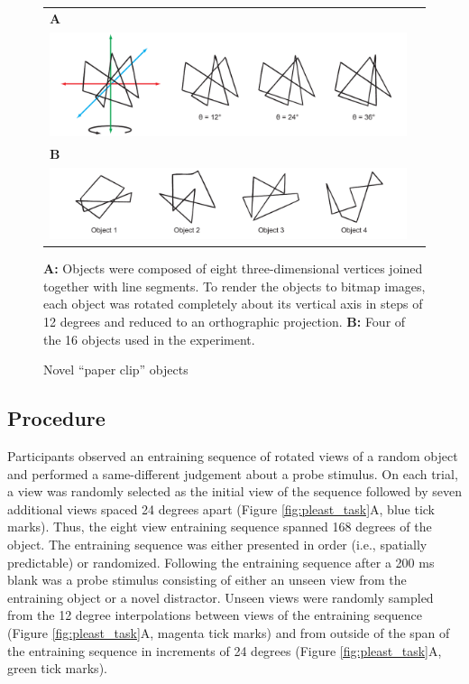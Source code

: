 \documentclass[dwyatte_dissertation.tex]{subfiles}
\begin{document}
\begin{figure}[h!]
\begin{center}
\begin{tabular}{ll}
\textbf{A} \\
\includegraphics[width=160mm]{figs/chap_pleast/paperclip_rots.pdf} \\
\textbf{B} \\
\includegraphics[width=160mm]{figs/chap_pleast/paperclip_objs.pdf} \\
\end{tabular}
\end{center}
\caption{Novel ``paper clip'' objects}{\textbf{A:} Objects were composed of eight three-dimensional vertices joined together with line segments. To render the objects to bitmap images, each object was rotated completely about its vertical axis in steps of 12 degrees and reduced to an orthographic projection. \textbf{B:} Four of the 16 objects used in the experiment.}
\label{fig:pleast_objs}
\end{figure}

\subsection{Procedure}
Participants observed an entraining sequence of rotated views of a random object and performed a same-different judgement about a probe stimulus. On each trial, a view was randomly selected as the initial view of the sequence followed by seven additional views spaced 24 degrees apart (Figure \ref{fig:pleast_task}A, blue tick marks). Thus, the eight view entraining sequence spanned 168 degrees of the object. The entraining sequence was either presented in order (i.e., spatially predictable) or randomized. Following the entraining sequence after a 200 ms blank was a probe stimulus consisting of either an unseen view from the entraining object or a novel distractor. Unseen views were randomly sampled from the 12 degree interpolations between views of the entraining sequence (Figure \ref{fig:pleast_task}A, magenta tick marks) and from outside of the span of the entraining sequence in increments of 24 degrees (Figure \ref{fig:pleast_task}A, green tick marks).
\end{document}

